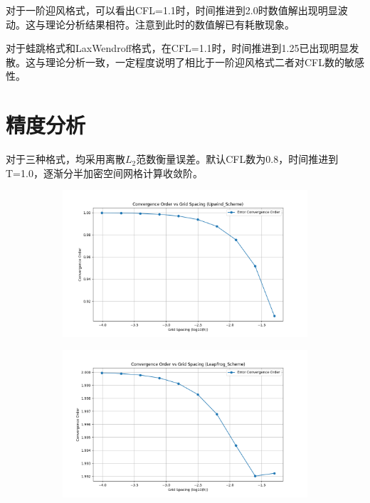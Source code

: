 \documentclass[12pt, a4paper]{article}
\begin{document}
对于一阶迎风格式，可以看出CFL=1.1时，时间推进到2.0时数值解出现明显波动。这与理论分析结果相符。注意到此时的数值解已有耗散现象。

对于蛙跳格式和LaxWendroff格式，在CFL=1.1时，时间推进到1.25已出现明显发散。这与理论分析一致，一定程度说明了相比于一阶迎风格式二者对CFL数的敏感性。

\section{精度分析}
对于三种格式，均采用离散$L_2$范数衡量误差。默认CFL数为0.8，时间推进到T=1.0，逐渐分半加密空间网格计算收敛阶。
\begin{figure}[htbp]
    \centering
    \begin{subfigure}[b]{0.45\textwidth} 
        \centering
        \includegraphics[width=\textwidth]{./pictures/Convergence_Order_of_Upwind_Scheme.png} 
    \end{subfigure}
    \hfill
    \begin{subfigure}[b]{0.45\textwidth} 
        \centering
        \includegraphics[width=\textwidth]{./pictures/Convergence_Order_of_LeapFrog_Scheme.png} 

\end{subfigure}
\end{figure}
\end{document}
